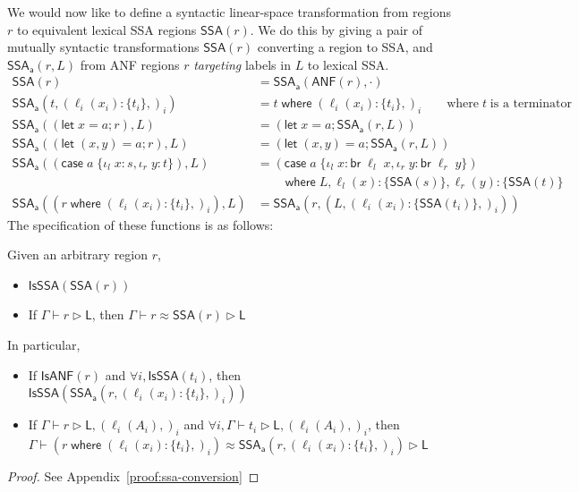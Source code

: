 \documentclass[acmsmall,screen,review]{acmart}
\newcommand{\ms}[1]{\ensuremath{\mathsf{#1}}}
\newcommand{\lto}{:}
\newcommand{\linl}[1]{\iota_l\;{#1}}
\newcommand{\linr}[1]{\iota_r\;{#1}}
\newcommand{\letstmt}[3]{\ensuremath{\ms{let}\;#1 = #2; #3}}
\newcommand{\brb}[2]{\ms{br}\;#1\;#2}
\newcommand{\casestmt}[5]{\ms{case}\;#1\;\{\linl{#2} \lto #3, \linr{#4} \lto #5\}}
\newcommand{\where}[2]{#1\;\ms{where}\;#2}
\newcommand{\wbranch}[3]{#1(#2) \lto \{#3\}}
\newcommand{\haslb}[3]{#1 \vdash #2 \rhd #3}
\newcommand{\teqv}{\approx}
\newcommand{\lbeq}[4]{#1 \vdash #2 \teqv #3 \rhd {#4}}
\newcommand{\toanf}[1]{\ms{ANF}(#1)}
\newcommand{\isanf}[1]{\ms{IsANF}(#1)}
\newcommand{\isssa}[1]{\ms{IsSSA}(#1)}
\newcommand{\tossa}[1]{\ms{SSA}(#1)}
\newcommand{\ssawhere}[2]{\ms{SSA}_{\ms{a}}(#1, #2)}
\begin{document}
We would now like to define a syntactic linear-space transformation from regions $r$ to equivalent
lexical SSA regions $\tossa{r}$. We do this by giving a pair of mutually syntactic transformations
$\tossa{r}$ converting a region to SSA, and $\ssawhere{r}{L}$ from ANF regions $r$ \emph{targeting}
labels in $L$ to lexical SSA.
\begin{equation}
  \begin{aligned}
    \tossa{r} & = \ssawhere{\toanf{r}}{\cdot} \\[1em]
    \ssawhere{t}{(\wbranch{\ell_i}{x_i}{t_i},)_i} 
      &= \where{t}{(\wbranch{\ell_i}{x_i}{t_i},)_i} \qquad \text{where}\;t\;\text{is a terminator}
      \\
    \ssawhere{(\letstmt{x}{a}{r})}{L} &= (\letstmt{x}{a}{\ssawhere{r}{L}}) \\
    \ssawhere{(\letstmt{(x, y)}{a}{r})}{L} &= (\letstmt{(x, y)}{a}{\ssawhere{r}{L}}) \\
    \ssawhere{(\casestmt{a}{x}{s}{y}{t})}{L} &=
     \where{(\casestmt{a}{x}{\brb{\ell_l}{x}}{y}
                    {\brb{\ell_r}{y}})  \\ & \qquad }
                    {L, \wbranch{\ell_l}{x}{\tossa{s}}, \wbranch{\ell_r}{y}{\tossa{t}}} \\
    \ssawhere{(\where{r}{(\wbranch{\ell_i}{x_i}{t_i},)_i})}{L} 
      &= \ssawhere{r}{(L, (\wbranch{\ell_i}{x_i}{\tossa{t_i}},)_i)}
  \end{aligned}
\end{equation}
The specification of these functions is as follows:
\begin{lemma}[name=SSA conversion, restate=ssaconversion]
  Given an arbitrary region $r$,
  \begin{itemize}
    \item $\isssa{\tossa{r}}$
    \item If $\haslb{\Gamma}{r}{\ms{L}}$, then $\lbeq{\Gamma}{r}{\tossa{r}}{\ms{L}}$
  \end{itemize}
  In particular,
  \begin{itemize}
    \item If $\isanf{r}$ and $\forall i, \isssa{t_i}$, then 
      $\isssa{\ssawhere{r}{(\wbranch{\ell_i}{x_i}{t_i},)_i}}$
    \item If $\haslb{\Gamma}{r}{\ms{L}, (\ell_i(A_i),)_i}$ and 
      $\forall i, \haslb{\Gamma}{t_i}{\ms{L}, (\ell_i(A_i),)_i}$, then 
      $\lbeq{\Gamma}
        {(\where{r}{(\wbranch{\ell_i}{x_i}{t_i},)_i})  }
        {\ssawhere{r}{(\wbranch{\ell_i}{x_i}{t_i},)_i}}{\ms{L}}$
  \end{itemize}
\end{lemma}
\begin{proof}
  See Appendix~\ref{proof:ssa-conversion}
\end{proof}
\end{document}
